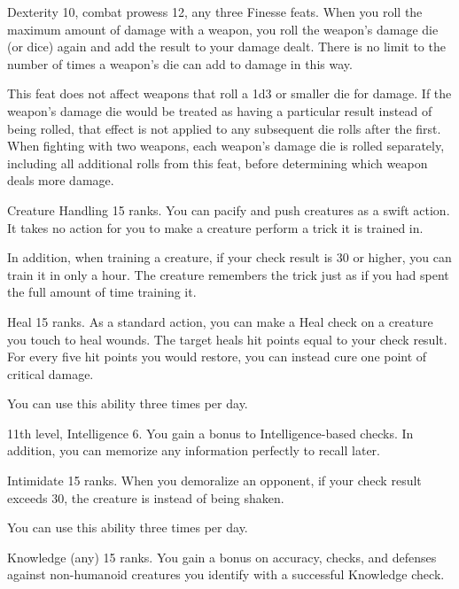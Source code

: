\featpres Dexterity 10, combat prowess 12, any three Finesse feats.
\featben When you roll the maximum amount of damage with a weapon, you roll the weapon's damage die (or dice) again and add the result to your damage dealt.
There is no limit to the number of times a weapon's die can add to damage in this way.

This feat does not affect weapons that roll a 1d3 or smaller die for damage.
If the weapon's damage die would be treated as having a particular result instead of being rolled, that effect is not applied to any subsequent die rolls after the first.
When fighting with two weapons, each weapon's damage die is rolled separately, including all additional rolls from this feat, before determining which weapon deals more damage.

\featpre Creature Handling 15 ranks.
\featben You can pacify and push creatures as a swift action.
It takes no action for you to make a creature perform a trick it is trained in.

In addition, when training a creature, if your check result is 30 or higher, you can train it in only a hour.
The creature remembers the trick just as if you had spent the full amount of time training it.

\featpre Heal 15 ranks.
\featben As a standard action, you can make a Heal check on a creature you touch to heal wounds.
The target heals hit points equal to your check result.
For every five hit points you would restore, you can instead cure one point of critical damage.

You can use this ability three times per day.

\featpres 11th level, Intelligence 6.
\featben You gain a  bonus to Intelligence-based checks.
In addition, you can memorize any information perfectly to recall later.

\featpre Intimidate 15 ranks.
\featben When you demoralize an opponent, if your check result exceeds 30, the creature is \panicked instead of being shaken.

You can use this ability three times per day.

\featpre Knowledge (any) 15 ranks.
\featben You gain a  bonus on accuracy, checks, and defenses against non-humanoid creatures you identify with a successful Knowledge check.

